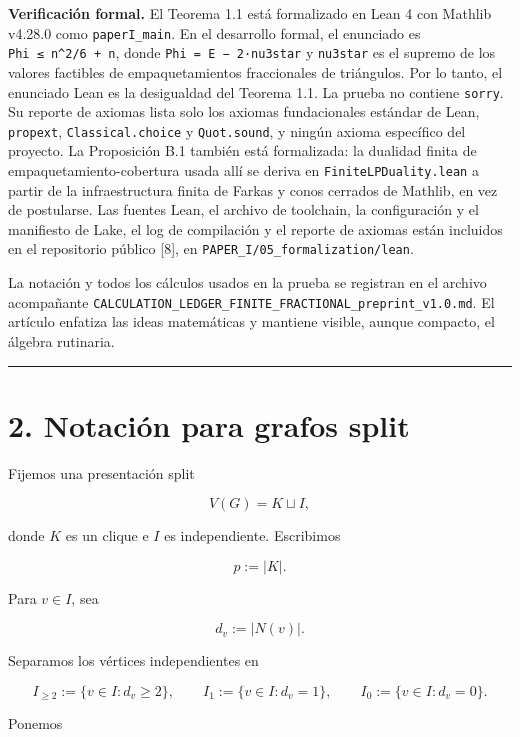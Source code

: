 \documentclass[
  11pt,
]{article}
\begin{document}
\textbf{Verificación formal.} El Teorema 1.1 está formalizado en Lean 4
con Mathlib v4.28.0 como \texttt{paperI\_main}. En el desarrollo formal,
el enunciado es \texttt{Phi\ ≤\ n\^{}2/6\ +\ n}, donde
\texttt{Phi\ =\ \textbar{}E\textbar{}\ −\ 2·nu3star} y \texttt{nu3star}
es el supremo de los valores factibles de empaquetamientos fraccionales
de triángulos. Por lo tanto, el enunciado Lean es la desigualdad del
Teorema 1.1. La prueba no contiene \texttt{sorry}. Su reporte de axiomas
lista solo los axiomas fundacionales estándar de Lean, \texttt{propext},
\texttt{Classical.choice} y \texttt{Quot.sound}, y ningún axioma
específico del proyecto. La Proposición B.1 también está formalizada: la
dualidad finita de empaquetamiento-cobertura usada allí se deriva en
\texttt{FiniteLPDuality.lean} a partir de la infraestructura finita de
Farkas y conos cerrados de Mathlib, en vez de postularse. Las fuentes
Lean, el archivo de toolchain, la configuración y el manifiesto de Lake,
el log de compilación y el reporte de axiomas están incluidos en el
repositorio público {[}8{]}, en
\texttt{PAPER\_I/05\_formalization/lean}.

La notación y todos los cálculos usados en la prueba se registran en el
archivo acompañante
\texttt{CALCULATION\_LEDGER\_FINITE\_FRACTIONAL\_preprint\_v1.0.md}. El
artículo enfatiza las ideas matemáticas y mantiene visible, aunque
compacto, el álgebra rutinaria.

\begin{center}\rule{0.5\linewidth}{0.5pt}\end{center}

\section{2. Notación para grafos
split}\label{notaciuxf3n-para-grafos-split}

Fijemos una presentación split

\[
V(G)=K\sqcup I,
\]

donde \(K\) es un clique e \(I\) es independiente. Escribimos

\[
p:=|K|.
\]

Para \(v\in I\), sea

\[
d_v:=|N(v)|.
\]

Separamos los vértices independientes en

\[
I_{\ge2}:=\{v\in I:d_v\ge2\},
\qquad
I_1:=\{v\in I:d_v=1\},
\qquad
I_0:=\{v\in I:d_v=0\}.
\]

Ponemos
\end{document}
